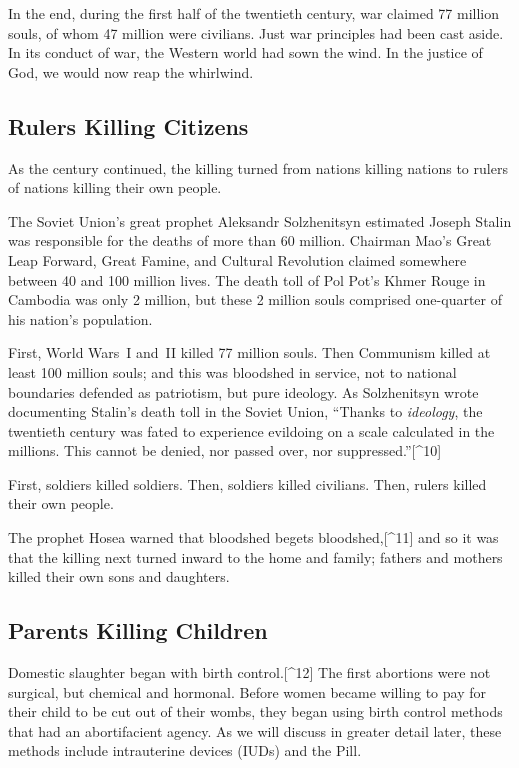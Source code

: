 \documentclass[
]{book}
\begin{document}
In the end, during the first half of the twentieth century, war claimed 77 million souls, of whom 47 million were civilians. Just war principles had been cast aside. In its conduct of war, the Western world had sown the wind. In the justice of God, we would now reap the whirlwind.

\hypertarget{rulers-killing-citizens}{%
\subsection{Rulers Killing Citizens}\label{rulers-killing-citizens}}

As the century continued, the killing turned from nations killing nations to rulers of nations killing their own people.

The Soviet Union's great prophet Aleksandr Solzhenitsyn estimated Joseph Stalin was responsible for the deaths of more than 60 million. Chairman Mao's Great Leap Forward, Great Famine, and Cultural Revolution claimed somewhere between 40 and 100 million lives. The death toll of Pol Pot's Khmer Rouge in Cambodia was only 2 million, but these 2 million souls comprised one-quarter of his nation's population.

First, World Wars~I and~II killed 77 million souls. Then Communism killed at least 100 million souls; and this was bloodshed in service, not to national boundaries defended as patriotism, but pure ideology. As Solzhenitsyn wrote documenting Stalin's death toll in the Soviet Union, ``Thanks to \emph{ideology}, the twentieth century was fated to experience evildoing on a scale calculated in the millions. This cannot be denied, nor passed over, nor suppressed.''{[}\^{}10{]}

First, soldiers killed soldiers. Then, soldiers killed civilians. Then, rulers killed their own people.

The prophet Hosea warned that bloodshed begets bloodshed,{[}\^{}11{]} and so it was that the killing next turned inward to the home and family; fathers and mothers killed their own sons and daughters.

\hypertarget{parents-killing-children}{%
\subsection{Parents Killing Children}\label{parents-killing-children}}

Domestic slaughter began with birth control.{[}\^{}12{]} The first abortions were not surgical, but chemical and hormonal. Before women became willing to pay for their child to be cut out of their wombs, they began using birth control methods that had an abortifacient agency. As we will discuss in greater detail later, these methods include intrauterine devices (IUDs) and the Pill.
\end{document}
